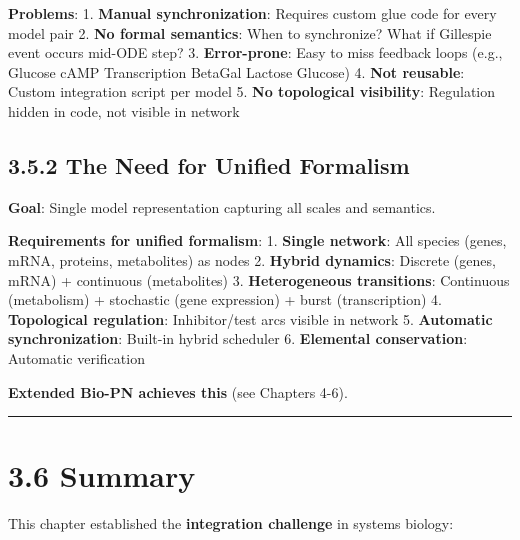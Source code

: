 \textbf{Problems}: 1. \textbf{Manual synchronization}: Requires custom
glue code for every model pair 2. \textbf{No formal semantics}: When to
synchronize? What if Gillespie event occurs mid-ODE step? 3.
\textbf{Error-prone}: Easy to miss feedback loops (e.g., Glucose \textrightarrow cAMP
\textrightarrow Transcription \textrightarrow BetaGal \textrightarrow Lactose \textrightarrow Glucose) 4. \textbf{Not reusable}:
Custom integration script per model 5. \textbf{No topological
visibility}: Regulation hidden in code, not visible in network

\hypertarget{the-need-for-unified-formalism}{%
\subsection{3.5.2 The Need for Unified
Formalism}\label{the-need-for-unified-formalism}}

\textbf{Goal}: Single model representation capturing all scales and
semantics.

\textbf{Requirements for unified formalism}: 1. \textbf{Single network}:
All species (genes, mRNA, proteins, metabolites) as nodes 2.
\textbf{Hybrid dynamics}: Discrete (genes, mRNA) + continuous
(metabolites) 3. \textbf{Heterogeneous transitions}: Continuous
(metabolism) + stochastic (gene expression) + burst (transcription) 4.
\textbf{Topological regulation}: Inhibitor/test arcs visible in network
5. \textbf{Automatic synchronization}: Built-in hybrid scheduler 6.
\textbf{Elemental conservation}: Automatic verification

\textbf{Extended Bio-PN achieves this} (see Chapters 4-6).

\begin{center}\rule{0.5\linewidth}{0.5pt}\end{center}

\hypertarget{summary}{%
\section{3.6 Summary}\label{summary}}

This chapter established the \textbf{integration challenge} in systems
biology:

